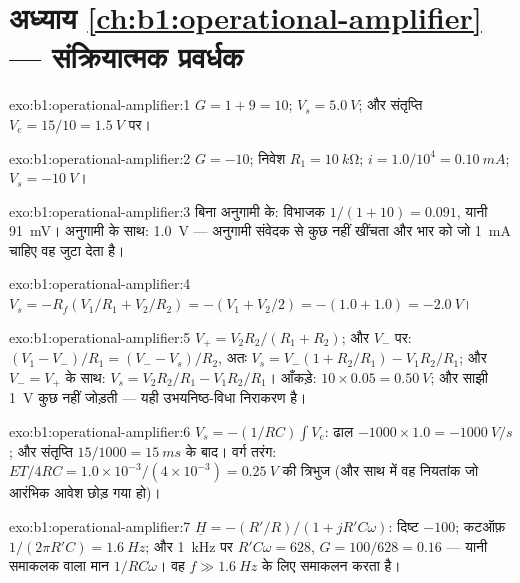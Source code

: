 \section*{अध्याय \ref{ch:b1:operational-amplifier} --- संक्रियात्मक प्रवर्धक}

\begin{solution}{exo:b1:operational-amplifier:1}
$G = 1 + 9 = 10$; $V_s = \qty{5.0}{V}$; और संतृप्ति $V_e = 15/10 =
\qty{1.5}{V}$ पर।
\end{solution}

\begin{solution}{exo:b1:operational-amplifier:2}
$G = -10$; निवेश  $R_1 = \qty{10}{k\ohm}$; $i = 1.0/10^4 =
\qty{0.10}{mA}$; $V_s = \qty{-10}{V}$।
\end{solution}

\begin{solution}{exo:b1:operational-amplifier:3}
बिना अनुगामी के: विभाजक $1/(1 + 10) = 0.091$, यानी \qty{91}{mV}। अनुगामी के
साथ: \qty{1.0}{V} --- अनुगामी संवेदक से कुछ नहीं खींचता और भार को जो
\qty{1}{mA} चाहिए वह जुटा देता है।
\end{solution}

\begin{solution}{exo:b1:operational-amplifier:4}
$V_s = -R_f(V_1/R_1 + V_2/R_2) = -(V_1 + V_2/2) = -(1.0 + 1.0) = \qty{-2.0}{V}$।
\end{solution}

\begin{solution}{exo:b1:operational-amplifier:5}
$V_+ = V_2R_2/(R_1 + R_2)$; और $V_-$ पर: $(V_1 - V_-)/R_1 = (V_- - V_s)/R_2$,
अतः $V_s = V_-(1 + R_2/R_1) - V_1R_2/R_1$; और $V_- = V_+$ के साथ:
$V_s = V_2R_2/R_1 - V_1R_2/R_1$। आँकड़े: $10 \times 0.05 = \qty{0.50}{V}$;
और साझी \qty{1}{V} कुछ नहीं जोड़ती --- यही उभयनिष्ठ-विधा निराकरण है।
\end{solution}

\begin{solution}{exo:b1:operational-amplifier:6}
$V_s = -(1/RC)\int V_e$: ढाल $-1000 \times 1.0 = \qty{-1000}{V/s}$;
और संतृप्ति $15/1000 = \qty{15}{ms}$ के बाद। वर्ग तरंग: 
$ET/4RC = 1.0 \times 10^{-3}/(4 \times 10^{-3}) = \qty{0.25}{V}$ की त्रिभुज
(और साथ में वह नियतांक जो आरंभिक आवेश छोड़ गया हो)।
\end{solution}

\begin{solution}{exo:b1:operational-amplifier:7}
$\underline H = -(R'/R)/(1 + jR'C\omega)$: दिष्ट  $-100$; कटऑफ़
$1/(2\pi R'C) = \qty{1.6}{Hz}$; और \qty{1}{kHz} पर $R'C\omega = 628$, $G =
100/628 = 0.16$ --- यानी समाकलक वाला मान $1/RC\omega$। वह
$f \gg \qty{1.6}{Hz}$ के लिए समाकलन करता है।
\end{solution}

